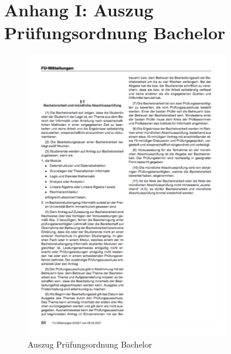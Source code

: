\documentclass[pdftex,a4paper,12pt]{scrartcl}
\theoremstyle{definition}
\begin{document}


\newpage
{}
{}   %

\newpage 
\section*{Anhang I: Auszug Prüfungsordnung Bachelor}
\label{sec:bachelor}     
\begin{figure}[!h]
	\centering
		\includegraphics[width=0.8\textwidth]{pics/Auszug_Bachelor_Pruefungsordnung.pdf}
	\caption{Auszug Prüfungsordnung Bachelor} 
\end{figure}
\end{document}
